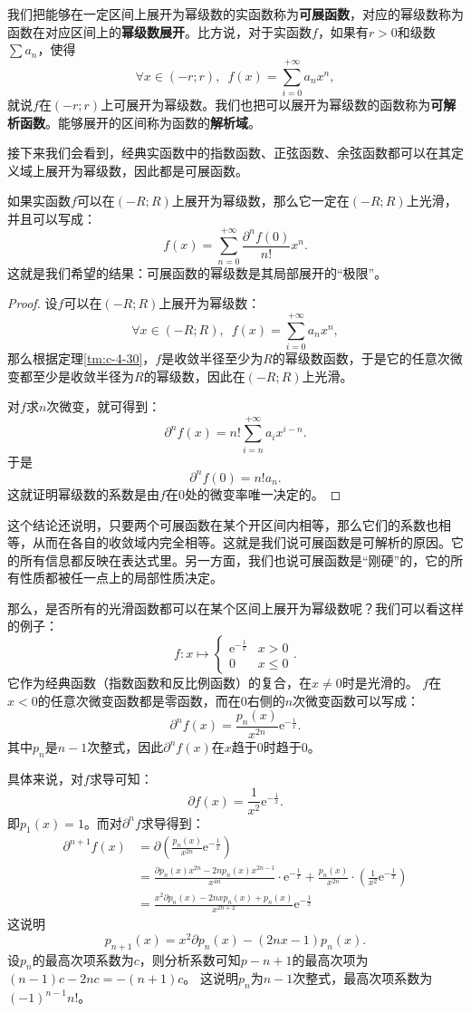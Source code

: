 \documentclass[12pt,UTF8]{ctexbook}
\begin{document}
\begin{appendix}
我们把能够在一定区间上展开为幂级数的实函数称为\textbf{可展函数}，对应的幂级数称为函数在对应区间上的\textbf{幂级数展开}。比方说，对于实函数$f$，如果有$r>0$和级数$\sum a_n$，使得
$$\forall x\in (-r;r),\,\,\, f(x) = \sum_{i=0}^{+\infty} a_n x^n,$$
就说$f$在$(-r;r)$上可展开为幂级数。我们也把可以展开为幂级数的函数称为\textbf{可解析函数}。能够展开的区间称为函数的\textbf{解析域}。

接下来我们会看到，经典实函数中的指数函数、正弦函数、余弦函数都可以在其定义域上展开为幂级数，因此都是可展函数。

如果实函数$f$可以在$(-R;R)$上展开为幂级数，那么它一定在$(-R;R)$上光滑，并且可以写成：
$$ f(x) = \sum_{n=0}^{+\infty} \frac{\partial^n f(0)}{n!} x^n. $$
这就是我们希望的结果：可展函数的幂级数是其局部展开的“极限”。

\begin{proof}
    设$f$可以在$(-R;R)$上展开为幂级数：
    $$\forall x\in (-R;R),\,\,\, f(x) = \sum_{i=0}^{+\infty} a_n x^n,$$
    那么根据定理\ref{tm:c-4-30}，$f$是收敛半径至少为$R$的幂级数函数，于是它的任意次微变都至少是收敛半径为$R$的幂级数，因此在$(-R;R)$上光滑。

    对$f$求$n$次微变，就可得到：
    $$ \partial^n f(x) = n! \sum_{i=n}^{+\infty} a_i x^{i-n}. $$
    于是
    $$ \partial^n f(0) = n! a_n. $$
    这就证明幂级数的系数是由$f$在$0$处的微变率唯一决定的。
\end{proof}

这个结论还说明，只要两个可展函数在某个开区间内相等，那么它们的系数也相等，从而在各自的收敛域内完全相等。这就是我们说可展函数是可解析的原因。它的所有信息都反映在表达式里。另一方面，我们也说可展函数是“刚硬”的，它的所有性质都被任一点上的局部性质决定。

那么，是否所有的光滑函数都可以在某个区间上展开为幂级数呢？我们可以看这样的例子：
$$ f: x\mapsto \begin{cases} \mathrm{e}^{-\frac{1}{x}} & x > 0 \\ 0 & x \leqslant 0 \end{cases}.$$
它作为经典函数（指数函数和反比例函数）的复合，在$x\neq 0$时是光滑的。
$f$在$x<0$的任意次微变函数都是零函数，而在$0$右侧的$n$次微变函数可以写成：
$$ \partial^n f(x) = \frac{p_n(x)}{x^{2n}} \mathrm{e}^{-\frac{1}{x}}.$$
其中$p_n$是$n-1$次整式，因此$\partial^n f(x)$在$x$趋于$0$时趋于$0$。

具体来说，对$f$求导可知：
$$ \partial f(x) = \frac{1}{x^{2}} \mathrm{e}^{-\frac{1}{x}}. $$
即$p_1(x) = 1$。而对$\partial^n f$求导得到：
\begin{align*}
    \partial^{n+1} f(x) &= \partial \left(\frac{p_n(x)}{x^{2n}} \mathrm{e}^{-\frac{1}{x}}\right) \\
    &= \frac{\partial p_n(x) x^{2n} - 2n p_n(x) x^{2n-1}}{x^{4n}} \cdot \mathrm{e}^{-\frac{1}{x}} + \frac{p_n(x)}{x^{2n}} \cdot \left( \frac{1}{x^{2}} \mathrm{e}^{-\frac{1}{x}}\right) \\
    &= \frac{x^2 \partial p_n(x) - 2nx p_n(x) + p_n(x)}{x^{2n+2}} \mathrm{e}^{-\frac{1}{x}}
\end{align*}
这说明
$$ p_{n+1}(x) = x^2 \partial p_n(x) - (2nx - 1)p_n(x).$$
设$p_n$的最高次项系数为$c$，则分析系数可知$p-{n+1}$的最高次项为$(n-1)c - 2nc = -(n+1)c$。
这说明$p_n$为$n-1$次整式，最高次项系数为$(-1)^{n-1}n!$。


\end{appendix}
\end{document}

